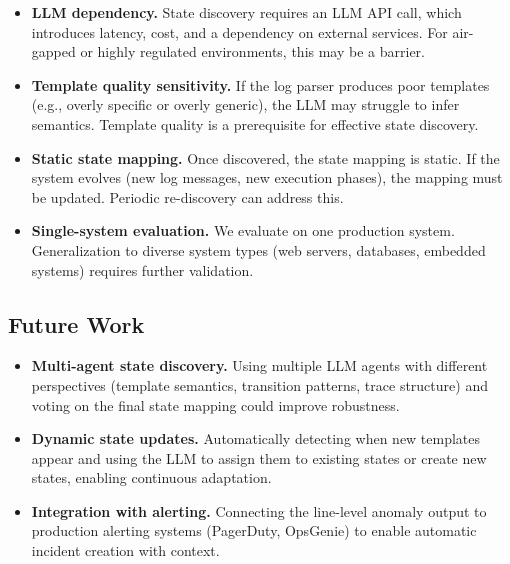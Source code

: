 \documentclass[11pt]{article}
\begin{document}
\begin{itemize}[leftmargin=*,itemsep=2pt]
    \item \textbf{LLM dependency.} State discovery requires an LLM API call, which introduces latency, cost, and a dependency on external services. For air-gapped or highly regulated environments, this may be a barrier.
    
    \item \textbf{Template quality sensitivity.} If the log parser produces poor templates (e.g., overly specific or overly generic), the LLM may struggle to infer semantics. Template quality is a prerequisite for effective state discovery.
    
    \item \textbf{Static state mapping.} Once discovered, the state mapping is static. If the system evolves (new log messages, new execution phases), the mapping must be updated. Periodic re-discovery can address this.
    
    \item \textbf{Single-system evaluation.} We evaluate on one production system. Generalization to diverse system types (web servers, databases, embedded systems) requires further validation.
\end{itemize}

\subsection{Future Work}

\begin{itemize}[leftmargin=*,itemsep=2pt]
    \item \textbf{Multi-agent state discovery.} Using multiple LLM agents with different perspectives (template semantics, transition patterns, trace structure) and voting on the final state mapping could improve robustness.
    
    \item \textbf{Dynamic state updates.} Automatically detecting when new templates appear and using the LLM to assign them to existing states or create new states, enabling continuous adaptation.
    
    \item \textbf{Integration with alerting.} Connecting the line-level anomaly output to production alerting systems (PagerDuty, OpsGenie) to enable automatic incident creation with context.
\end{itemize}

\end{document}
